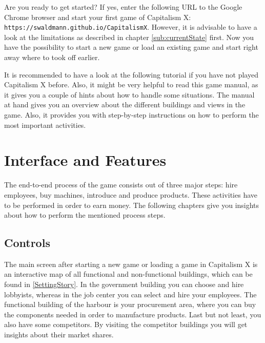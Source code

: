 \documentclass[11pt,titlepage,oneside,openany]{book}
\begin{document}
Are you ready to get started? If yes, enter the following URL to the Google Chrome browser and start your first game of Capitalism X: \\
\texttt{https://swaldmann.github.io/CapitalismX}.
However, it is advisable to have a look at the limitations as described in chapter \ref{sub:currentState} first. Now you have the possibility to start a new game or load an existing game and start right away where to took off earlier. 

It is recommended to have a look at the following tutorial if you have not played Capitalism X before. Also, it might be very helpful to read this game manual, as it gives you a couple of hints about how to handle some situations. The manual at hand gives you an overview about the different buildings and views in the game. Also, it provides you with step-by-step instructions on how to perform the most important activities.

\section{Interface and Features}
The end-to-end process of the game consists out of three major steps: hire employees, buy machines, introduce and produce products. These activities have to be performed in order to earn money. The following chapters give you insights about how to perform the mentioned process steps.

\subsection{Controls}  
The main screen after starting a new game or loading a game in Capitalism X is an interactive map of all functional and non-functional buildings, which can be found in \ref{SettingStory}. In the government building you can choose and hire lobbyists, whereas in the job center you can select and hire your employees. The functional building of the harbour is your procurement area, where you can buy the components needed in order to manufacture products. Last but not least, you also have some competitors. By visiting the competitor buildings you will get insights about their market shares.
\end{document}
